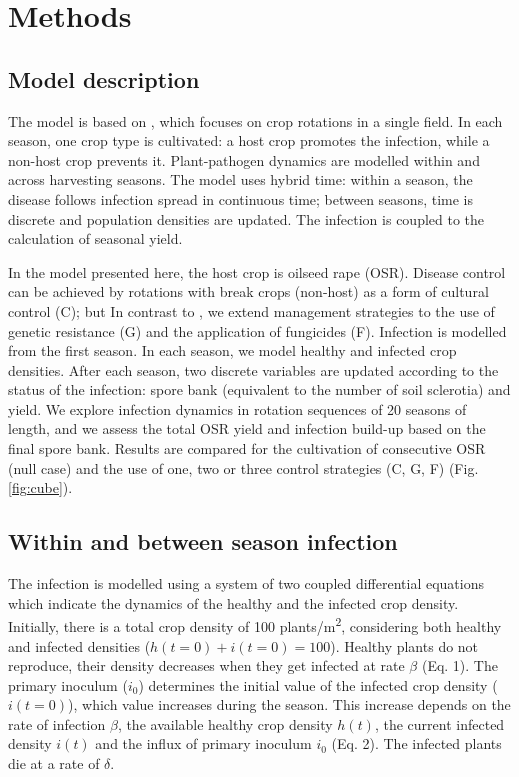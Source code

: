\documentclass{article}
\begin{document}
\section{Methods}


\subsection{Model description}


The model is based on \cite{bargues-ribera:PCB:2019}, which focuses on crop rotations in a single field. In each season, one crop type is cultivated: a host crop promotes the infection, while a non-host crop prevents it. Plant-pathogen dynamics are modelled within and across harvesting seasons. The model uses hybrid time: within a season, the disease follows infection spread in continuous time; between seasons, time is discrete and population densities are updated. The infection is coupled to the calculation of seasonal yield. 

In the model presented here, the host crop is oilseed rape (OSR). Disease control can be achieved by rotations with break crops (non-host) as a form of cultural control (C); but In contrast to \cite{bargues-ribera:PCB:2019}, we extend management strategies to the use of genetic resistance (G) and the application of fungicides (F). Infection is modelled from the first season. In each season, we model healthy and infected crop densities. After each season, two discrete variables are updated according to the status of the infection: spore bank (equivalent to the number of soil sclerotia) and yield. We explore infection dynamics in rotation sequences of 20 seasons of length, and we assess the total OSR yield and infection build-up based on the final spore bank. Results are compared for the cultivation of consecutive OSR (null case) and the use of one, two or three control strategies (C, G, F) (Fig. \ref{fig:cube}). 

\subsection{Within and between season infection}

The infection is modelled using a system of two coupled differential equations which indicate the dynamics of the healthy and the infected crop density. Initially, there is a total crop density of 100 plants/m\textsuperscript{2}, considering both healthy and infected densities ($h(t=0) + i(t=0) = 100$). Healthy plants do not reproduce, their density decreases when they get infected at rate $\beta$ (Eq. 1). The primary inoculum ($i_0$) determines the initial value of the infected crop density ($i(t=0)$), which value increases during the season. This increase depends on the rate of infection $\beta$, the available healthy crop density $h(t)$, the current infected density $i(t)$ and the influx of primary inoculum $i_0$ (Eq. 2). The infected plants die at a rate of $\delta$. 
\end{document}
